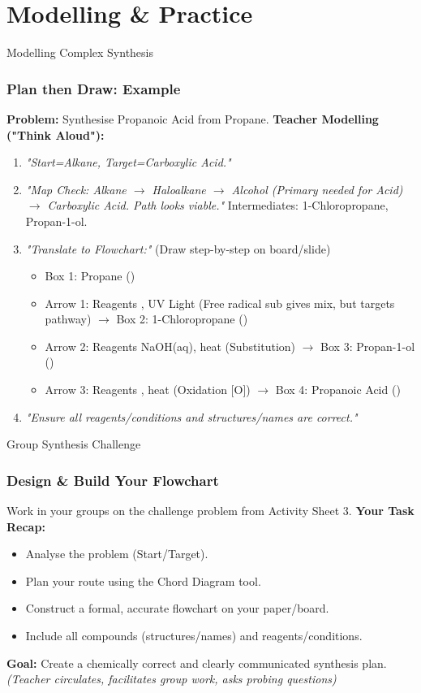 \documentclass[xcolor=svgnames]{beamer}
\begin{document}
\section{Modelling & Practice}
\begin{frame}{Modelling Complex Synthesis}
    \frametitle{Plan then Draw: Example}
    \textbf{Problem:} Synthesise Propanoic Acid from Propane.
    \vspace{1em}
    \textbf{Teacher Modelling ("Think Aloud"):}
    \begin{enumerate}
        \item \textit{"Start=Alkane, Target=Carboxylic Acid."}
        \item \textit{"Map Check: Alkane $\rightarrow$ Haloalkane $\rightarrow$ Alcohol (Primary needed for Acid) $\rightarrow$ Carboxylic Acid. Path looks viable."} Intermediates: 1-Chloropropane, Propan-1-ol.
        \item \textit{"Translate to Flowchart:"} (Draw step-by-step on board/slide)
            \begin{itemize}
                \item Box 1: Propane ()
                \item Arrow 1: Reagents , UV Light (Free radical sub gives mix, but targets pathway) $\rightarrow$ Box 2: 1-Chloropropane ()
                \item Arrow 2: Reagents NaOH(aq), heat (Substitution) $\rightarrow$ Box 3: Propan-1-ol ()
                \item Arrow 3: Reagents , heat (Oxidation [O]) $\rightarrow$ Box 4: Propanoic Acid ()
            \end{itemize}
        \item \textit{"Ensure all reagents/conditions and structures/names are correct."}
    \end{enumerate}
\end{frame}

\begin{frame}{Group Synthesis Challenge}
    \frametitle{Design & Build Your Flowchart}
    Work in your groups on the challenge problem from Activity Sheet 3.
    \vspace{1em}
    \textbf{Your Task Recap:}
    \begin{itemize}
        \item Analyse the problem (Start/Target).
        \item Plan your route using the Chord Diagram tool.
        \item Construct a formal, accurate flowchart on your paper/board.
        \item Include all compounds (structures/names) and reagents/conditions.
    \end{itemize}
    \vspace{1em}
    \textbf{Goal:} Create a chemically correct and clearly communicated synthesis plan.
    \vspace{1em}
    \textit{(Teacher circulates, facilitates group work, asks probing questions)}
\end{frame}
\end{document}
